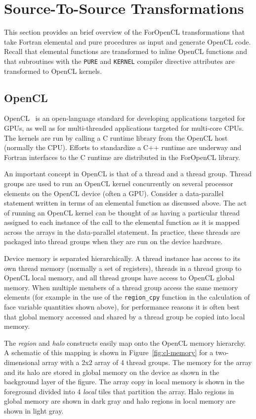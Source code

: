 \section{Source-To-Source Transformations}

This section provides an brief overview of the ForOpenCL transformations that take
Fortran elemental and pure procedures as input and generate OpenCL code.  Recall
that elemental functions are transformed to inline OpenCL functions and that
subroutines with the {\tt PURE} and {\tt KERNEL} compiler directive attributes
are transformed to OpenCL kernels.

\subsection{OpenCL}

OpenCL~\cite{opencl08} is an open-language standard for developing applications
targeted for GPUs, as well as for multi-threaded applications targeted for
multi-core CPUs.  The kernels are run by calling a C runtime library from the
OpenCL host (normally the CPU).  Efforts to standardize a C++ runtime are
underway and Fortran interfaces to the C runtime are distributed in the ForOpenCL
library.

An important concept in OpenCL is that of a thread and a thread group.  Thread
groups are used to run an OpenCL kernel concurrently on several processor
elements on the OpenCL device (often a GPU).  Consider a data-parallel statement
written in terms of an elemental function as discussed above.  The act of
running an OpenCL kernel can be thought of as having a particular thread
assigned to each instance of the call to the elemental function as it is mapped
across the arrays in the data-parallel statement.  In practice, these threads
are packaged into thread groups when they are run on the device hardware.

Device memory is separated hierarchically.  A thread instance has access to its
own thread memory (normally a set of registers), threads in a thread group to
OpenCL local memory, and all thread groups have access to OpenCL global memory.
When multiple members of a thread group access the same memory elements (for
example in the use of the {\tt region\_cpy} function in the calculation of face
variable quantities shown above), for performance reasons it is often best that
global memory accessed and shared by a thread group be copied into local memory.

The \emph{region} and \emph{halo} constructs easily map onto the OpenCL memory
hierarchy.  A schematic of this mapping is shown in Figure~\ref{fig:cl-memory}
for a two-dimensional array with a 2x2 array of 4 thread groups.  The memory
for the array and its halo are stored in global memory on the device as shown
in the background layer of the figure.  The array copy in local memory is
shown in the foreground divided into 4 \emph{local} tiles that partition the
array.  Halo regions in global memory are shown in dark gray and halo regions
in local memory are shown in light gray.

